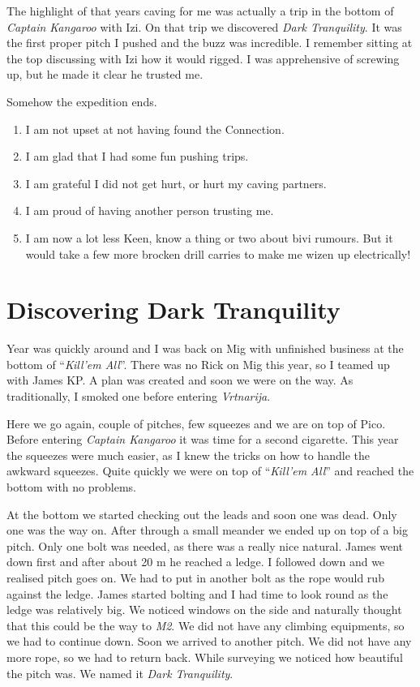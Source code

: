 The highlight of that years caving for me was actually a trip in the
bottom of \emph{Captain Kangaroo} with Izi. On that trip we discovered
\emph{Dark Tranquility}. It was the first proper pitch I pushed and the
buzz was incredible. I remember sitting at the top discussing with Izi
how it would rigged. I was apprehensive of screwing up, but he made it
clear he trusted me.

Somehow the expedition ends.

\begin{enumerate}
\def\labelenumi{\arabic{enumi}.}
\tightlist
\item
  I am not upset at not having found the Connection.
\item
  I am glad that I had some fun pushing trips.
\item
  I am grateful I did not get hurt, or hurt my caving partners.
\item
  I am proud of having another person trusting me.
\item
  I am now a lot less Keen, know a thing or two about bivi rumours. But
  it would take a few more brocken drill carries to make me wizen up
  electrically!
\end{enumerate}


\hypertarget{discovering-dark-tranquility}{%
\section{Discovering Dark
Tranquility}\label{discovering-dark-tranquility}}

Year was quickly around and I was back on Mig with unfinished business
at the bottom of ``\emph{Kill'em All}''. There was no Rick on Mig this
year, so I teamed up with James KP. A plan was created and soon we were
on the way. As traditionally, I smoked one before entering
\emph{Vrtnarija}.

Here we go again, couple of pitches, few squeezes and we are on top of
Pico. Before entering \emph{Captain Kangaroo} it was time for a second
cigarette. This year the squeezes were much easier, as I knew the tricks
on how to handle the awkward squeezes. Quite quickly we were on top of
``\emph{Kill'em All}'' and reached the bottom with no problems.

At the bottom we started checking out the leads and soon one was dead.
Only one was the way on. After through a small meander we ended up on
top of a big pitch. Only one bolt was needed, as there was a really nice
natural. James went down first and after about 20 m he reached a ledge.
I followed down and we realised pitch goes on. We had to put in another
bolt as the rope would rub against the ledge. James started bolting and
I had time to look round as the ledge was relatively big. We noticed
windows on the side and naturally thought that this could be the way to
\emph{M2}. We did not have any climbing equipments, so we had to
continue down. Soon we arrived to another pitch. We did not have any
more rope, so we had to return back. While surveying we noticed how
beautiful the pitch was. We named it \emph{Dark Tranquility}.

